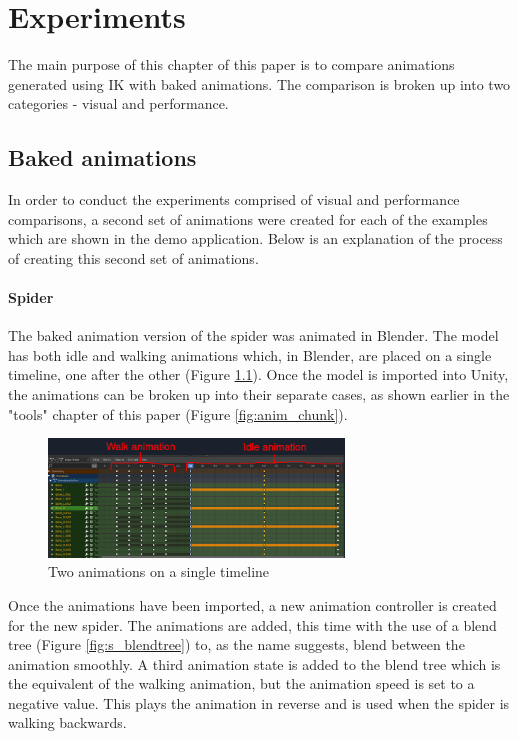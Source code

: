 \chapter{Experiments}
The main purpose of this chapter of this paper is to compare animations
generated using IK with baked animations. The comparison
is broken up into two categories - visual and performance. 

\section{Baked animations}
 In order to conduct the experiments comprised of visual and performance
 comparisons, a second set of animations were created for each of the examples which
 are shown in the demo application. Below is an explanation of the process of
 creating this second set of animations.

\subsubsection{Spider}
The baked animation version of the spider was animated in Blender. The model
has both idle and walking animations which, in Blender, are placed on
a single timeline, one after the other (Figure \ref{fig:timeline}). Once the model is imported
into Unity, the animations can be broken up into their separate cases, as shown
earlier in the "tools" chapter of this paper (Figure \ref{fig:anim_chunk}). 

\begin{figure}[h!]
    \centering
    \includegraphics[width=0.7\textwidth]{grafika/blender_timeline.png}
    \caption{Two animations on a single timeline}
    \label{fig:timeline}
\end{figure}

Once the animations have been imported, a new animation controller is created
for the new spider. The animations are added, this time with the use of a blend
tree (Figure \ref{fig:s_blendtree}) to, as the name suggests, blend between the
animation smoothly. A third animation state is added to the blend tree
which is the equivalent of the walking animation, but the animation speed is set
to a negative value. This plays the animation in reverse and is used when the
spider is walking backwards. 

